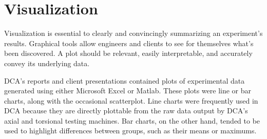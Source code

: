 \documentclass[11pt,a4paper,article]{memoir} %
\begin{document}
\section{Visualization}
\label{sec:dca_vis}
Visualization is essential to clearly and convincingly summarizing an experiment's results. Graphical tools allow engineers and clients to see for themselves what's been discovered. A plot should be relevant, easily interpretable, and accurately convey its underlying data.
\par
DCA's reports and client presentations contained plots of experimental data generated using either Microsoft Excel or Matlab. These plots were line or bar charts, along with the occasional scatterplot. Line charts were frequently used in DCA because they are directly plottable from the raw data output by DCA's axial and torsional testing machines. Bar charts, on the other hand, tended to be used to highlight differences between groups, such as their means or maximums.
\end{document}
